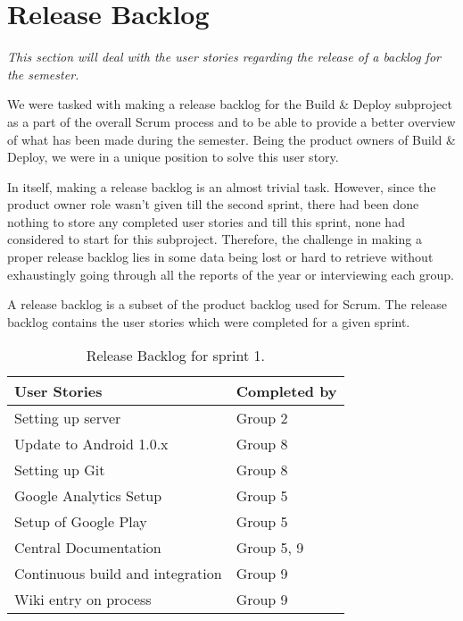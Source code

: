 \section{Release Backlog} \label{Roles_SecReleaseBacklog}
\textit{This section will deal with the user stories regarding the release of a backlog for the semester.}

We were tasked with making a release backlog for the Build \& Deploy subproject as a part of the overall Scrum process and to be able to provide a better overview of what has been made during the semester. Being the product owners of Build \& Deploy, we were in a unique position to solve this user story.

In itself, making a release backlog is an almost trivial task. However, since the product owner role wasn't given till the second sprint, there had been done nothing to store any completed user stories and till this sprint, none had considered to start for this subproject.
Therefore, the challenge in making a proper release backlog lies in some data being lost or hard to retrieve without exhaustingly going through all the reports of the year or interviewing each group.

A release backlog is a subset of the product backlog used for Scrum. The release backlog contains the user stories which were completed for a given sprint.

\begin{table}
	\centering
	\begin{tabular}{ll}
		\textbf{User Stories} & \textbf{Completed by}\\ \hline \noalign{\vskip 2mm}
		Setting up server & Group 2\\ \hline
		Update to Android 1.0.x & Group 8\\ \hline
		Setting up Git & Group 8\\ \hline
		Google Analytics Setup & Group 5\\ \hline
		Setup of Google Play & Group 5\\ \hline
		Central Documentation & Group 5, 9\\ \hline
		Continuous build and integration & Group 9\\ \hline
		Wiki entry on process & Group 9\\ \hline
	\end{tabular}
	\caption{Release Backlog for sprint 1.}
	\label{Roles_ReleaseBacklogSprint1_table}
\end{table}

